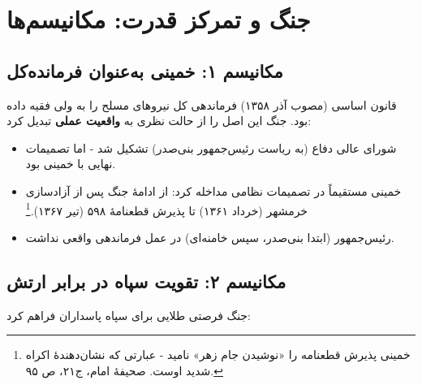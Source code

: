 \documentclass[12pt,a4paper]{book}
\newcommand{\keyword}[1]{\textbf{\textcolor{cPrimary}{#1}}}
\begin{document}
\section{جنگ و تمرکز قدرت: مکانیسم‌ها}

\subsection{مکانیسم ۱: خمینی به‌عنوان فرمانده‌کل}

قانون اساسی (مصوب آذر ۱۳۵۸) فرماندهی کل نیروهای مسلح را به ولی فقیه داده بود. جنگ این اصل را از حالت نظری به \keyword{واقعیت عملی} تبدیل کرد:

\begin{itemize}[label=\textcolor{cPrimary}{$\blacktriangleright$}, rightmargin=2em]
    \item شورای عالی دفاع (به ریاست رئیس‌جمهور بنی‌صدر) تشکیل شد - اما تصمیمات نهایی با خمینی بود.
    \item خمینی مستقیماً در تصمیمات نظامی مداخله کرد: از ادامهٔ جنگ پس از آزادسازی خرمشهر (خرداد ۱۳۶۱) تا پذیرش قطعنامهٔ ۵۹۸ (تیر ۱۳۶۷).\footnote{خمینی پذیرش قطعنامه را «نوشیدن جام زهر» نامید - عبارتی که نشان‌دهندهٔ اکراه شدید اوست. صحیفهٔ امام، ج۲۱، ص ۹۵.}
    \item رئیس‌جمهور (ابتدا بنی‌صدر، سپس خامنه‌ای) در عمل فرماندهی واقعی نداشت.
\end{itemize}

\subsection{مکانیسم ۲: تقویت سپاه در برابر ارتش}

جنگ فرصتی طلایی برای سپاه پاسداران فراهم کرد:
\end{document}
